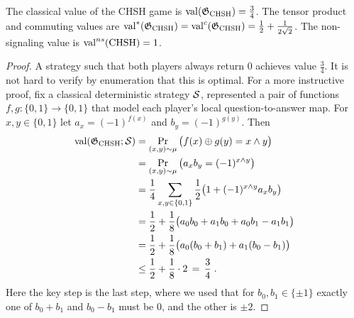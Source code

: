 \begin{lemma}\label{lemma-chsh-qval}
The classical value of the CHSH game is $\mathrm{val}(\mathfrak{G}_{\mathrm{CHSH}})=\frac{3}{4}$. The tensor product and commuting values are $\mathrm{val}^*(\mathfrak{G}_{\mathrm{CHSH}})=\mathrm{val}^c(\mathfrak{G}_{\mathrm{CHSH}})= \frac{1}{2} + \frac{1}{2\sqrt{2}}$. The non-signaling value is $\mathrm{val}^{ns}(\mathrm{CHSH})=1$. 
\end{lemma}

\begin{proof}
A strategy such that both players always return $0$ achieves value $\frac{3}{4}$. It is not hard to verify by enumeration that this is optimal. For a more instructive proof, fix a classical deterministic strategy $\mathcal{S}$, represented a pair of functions $f,g:\{0,1\}\to\{0,1\}$ that model each player's local question-to-answer map. For $x,y\in\{0,1\}$ let $a_x = (-1)^{f(x)}$ and $b_y = (-1)^{g(y)}$. Then 
\begin{align}
\mathrm{val}(\mathfrak{G}_{\mathrm{CHSH}};\mathcal{S}) &= \Pr_{(x,y)\sim \mu} \big( f(x)\oplus g(y) = x\wedge y \big) \label{equation-chsh-qval1}\\
 &= \Pr_{(x,y)\sim \mu} \big( a_x b_y = (-1)^{x\wedge y} \big) \notag\\
&= \frac{1}{4}\sum_{x,y\in\{0,1\}}\frac{1}{2}\big(1 + (-1)^{x\wedge y} a_x b_y\big)\notag\\
&= \frac{1}{2} + \frac{1}{8}\big( a_0 b_0 + a_1 b_0 + a_0 b_1 - a_1 b_1 \big)\notag\\
 &= \frac{1}{2} + \frac{1}{8}\big( a_0 (b_0 + b_1) + a_1 (b_0 -  b_1) \big)\notag\\
&\leq \frac{1}{2} + \frac{1}{8} \cdot 2\,=\, \frac{3}{4}\;.\notag
\end{align}
Here the key step is the last step, where we used that for $b_0,b_1 \in \{\pm 1\}$ exactly one of $b_0+b_1$ and $b_0-b_1$ must be $0$, and the other is $\pm 2$. 


\end{proof}

